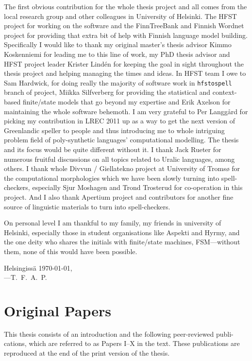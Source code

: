 \documentclass[officiallayout]{unihelcompling}
\begin{document}
The first obvious contribution for the whole thesis project and all comes from
the local research group and other colleagues in University of Helsinki. The
HFST project for working on the software and the FinnTreeBank and Finnish
Wordnet project for providing that extra bit of help with Finnish language
model building. Specifically I would like to thank my original master's thesis
advisor Kimmo Koskenniemi for leading me to this line of work, my PhD thesis
advisor and HFST project leader Krister Lindén for keeping the goal in sight
throughout the thesis project and helping managing the times and ideas.  In
HFST team I owe to Sam Hardwick, for doing really the majority of software work
in \texttt{hfstospell} branch of project, Miikka Silfverberg for providing the
statistical and context-based finite\-/state models that go beyond my expertise
and Erik Axelson for maintaining the whole software behemoth.  I am very
grateful to Per Langgård for picking my contribution in LREC 2011 up as a way
to get the next version of Greenlandic speller to people and thus introducing
me to whole intriguing problem field of poly-synthetic languages' computational
modelling. The thesis and its focus would be quite different without it.  I
thank Jack Rueter for numerous fruitful discussions on all topics related to
Uralic languages, among others. I thank whole Divvun / Giellatekno project at
University of Tromsø for the computational morphologies which we have been
slowly turning into spell-checkers, especially Sjur Moshagen and Trond
Trosterud for co-operation in this project. And I also thank Apertium project
and contributors for another fine source of linguistic materials to turn into
spell-checkers.

On personal level I am thankful to my family, my friends in university of
Helsinki, especially those in student organisations like Aspekti and Hyrmy, and
the one deity who shares the initials with finite\-/state machines,
FSM---without them, none of this would have been possible.

\textfinnish{Helsingissä \today,\\
---T.~F.~A.~P.}

\chapter*{Original Papers}
\label{chap:papers}

This thesis consists of an introduction and the following peer-reviewed publi-
cations, which are referred to as Papers I–X in the text. These publications
are reproduced at the end of the print version of the thesis.
\end{document}

